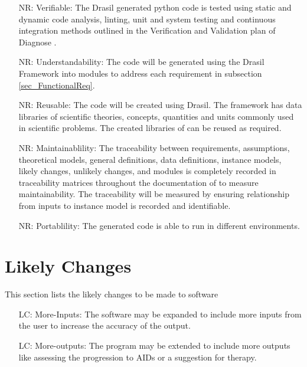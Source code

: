 \documentclass[12pt]{article}
\newcounter{reqnum} %
\newcounter{nreqnum} %
\newcounter{lcnum} %
\begin{document}
\noindent \begin{itemize}

\item[NR\refstepcounter{nreqnum}\thenreqnum \label{NR_Verifiable}:] 
Verifiable: The Drasil generated python code is tested using static and dynamic 
code analysis, linting, unit and system testing and continuous integration 
methods outlined in the Verification and Validation plan of Diagnose 
\citep{DiagnoseVNVplan}.


\item[NR\refstepcounter{nreqnum}\thenreqnum \label{NR_Understandability}:] 
Understandability: The code will be generated using the Drasil Framework into 
modules to address each requirement in subsection \ref{sec_FunctionalReq}.

\item[NR\refstepcounter{nreqnum}\thenreqnum \label{NR_Reusable}:] 
Reusable: The code will be created using Drasil. The framework has data 
libraries of scientific theories, concepts, quantities and units commonly used 
in scientific problems. The created libraries of \progname{} can be reused as 
required. \citep{Drasilcreate}

\item[NR\refstepcounter{nreqnum}\thenreqnum \label{NR_Maintainability}:] 
Maintainablility: The traceability between requirements, assumptions, 
theoretical models, general 
definitions, data definitions, instance models, likely changes, unlikely 
changes, and modules is completely recorded in traceability matrices throughout 
the documentation of  \progname{} to measure maintainability. The traceability 
will be measured by 
ensuring relationship from inputs to instance model is recorded and 
identifiable. 

\item[NR\refstepcounter{nreqnum}\thenreqnum \label{NR_Portablility}:] 
Portablility: The generated code is able to run in different environments. 


\end{itemize}


\section{Likely Changes} 

This section lists the likely changes to be made to software   

\noindent \begin{itemize}

\item[LC\refstepcounter{lcnum}\thelcnum\label{LC_more_inputs}:] More-Inputs: The 
software may be expanded to include more inputs from the user to increase the 
accuracy of the output.

\item[LC\refstepcounter{lcnum}\thelcnum\label{LC_more_outputs}:] 
More-outputs: The program may be extended to include more outputs like assessing 
the progression to AIDs or a suggestion for therapy.
\end{itemize}
\end{document}
